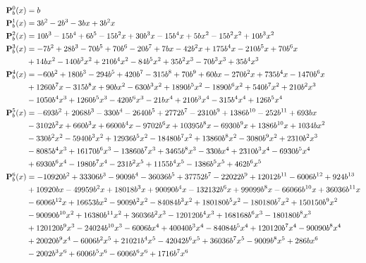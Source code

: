 ﻿\begin{equation*}
    \begin{split}
        {\mathbf{P}}\sp{0} \sb{b}(x)
        &=b \\
        {\mathbf{P}}\sp{1} \sb{b}(x)
        &=3 b^2 - 2 b^3 - 3 b x + 3 b^2 x \\
        {\mathbf{P}}\sp{2} \sb{b}(x)
        &=10 b^3 - 15 b^4 + 6 b^5- 15 b^2 x + 30 b^3 x - 15 b^4 x + 5 b x^2 - 15 b^2 x^2 + 10 b^3 x^2 \\
        {\mathbf{P}}\sp{3} \sb{b}(x)
        &=-7 b^2 + 28 b^3 - 70 b^5 + 70 b^6 - 20 b^7 + 7 b x - 42 b^2 x + 175 b^4 x - 210 b^5 x + 70 b^6 x \\
        &+ 14 b x^2 - 140 b^3 x^2 + 210 b^4 x^2 - 84 b^5 x^2 + 35 b^2 x^3 - 70 b^3 x^3 + 35 b^4 x^3 \\
        {\mathbf{P}}\sp{4} \sb{b}(x)
        &= -60 b^2 + 180 b^3 - 294 b^5 + 420 b^7 - 315 b^8 + 70 b^9 + 60 b x - 270 b^2 x + 735 b^4 x - 1470 b^6 x \\
        &+ 1260 b^7 x - 315 b^8 x + 90 b x^2 - 630 b^3 x^2 + 1890 b^5 x^2 - 1890 b^6 x^2 + 540 b^7 x^2 + 210 b^2 x^3 \\
        &- 1050 b^4 x^3 + 1260 b^5 x^3 - 420 b^6 x^3 - 21 b x^4 + 210 b^3 x^4 - 315 b^4 x^4 + 126 b^5 x^4\\
        {\mathbf{P}}\sp{5} \sb{b}(x)
        &= -693 b^2 + 2068 b^3 - 330 b^4 - 2640 b^5 + 2772 b^7 - 2310 b^9 + 1386 b^{10} - 252 b^{11} + 693 b x \\
        &- 3102 b^2 x + 660 b^3 x + 6600 b^4 x - 9702 b^6 x + 10395 b^8 x - 6930 b^9 x + 1386 b^{10} x + 1034 b x^2 \\
        &- 330 b^2 x^2 - 5940 b^3 x^2 + 12936 b^5 x^2 - 18480 b^7 x^2 + 13860 b^8 x^2 - 3080 b^9 x^2 + 2310 b^2 x^3 \\
        &- 8085 b^4 x^3 + 16170 b^6 x^3 - 13860 b^7 x^3 + 3465 b^8 x^3 - 330 b x^4 + 2310 b^3 x^4 - 6930 b^5 x^4 \\
        &+ 6930 b^6 x^4 - 1980 b^7 x^4 - 231 b^2 x^5 + 1155 b^4 x^5 - 1386 b^5 x^5 + 462 b^6 x^5 \\
        {\mathbf{P}}\sp{6} \sb{b}(x)
        &= -10920 b^2 + 33306 b^3 - 9009 b^4 - 36036 b^5 + 37752 b^7 - 22022 b^9 + 12012 b^{11} - 6006 b^{12} + 924 b^{13} \\
        &+ 10920 b x - 49959 b^2 x + 18018 b^3 x + 90090 b^4 x - 132132 b^6 x + 99099 b^8 x - 66066 b^{10} x + 36036 b^{11} x \\
        &- 6006 b^{12} x + 16653 b x^2 - 9009 b^2 x^2 - 84084 b^3 x^2 + 180180 b^5 x^2 - 180180 b^7 x^2 + 150150 b^9 x^2 \\
        &- 90090 b^{10} x^2 + 16380 b^{11} x^2 + 36036 b^2 x^3 - 120120 b^4 x^3 + 168168 b^6 x^3 - 180180 b^8 x^3 \\
        &+ 120120 b^9 x^3 - 24024 b^{10} x^3 - 6006 b x^4 + 40040 b^3 x^4 - 84084 b^5 x^4 + 120120 b^7 x^4 - 90090 b^8 x^4 \\
        &+ 20020 b^9 x^4 - 6006 b^2 x^5 + 21021 b^4 x^5 - 42042 b^6 x^5 + 36036 b^7 x^5 - 9009 b^8 x^5 + 286 b x^6 \\
        &- 2002 b^3 x^6 + 6006 b^5 x^6 - 6006 b^6 x^6 + 1716 b^7 x^6
    \end{split}
\end{equation*}
